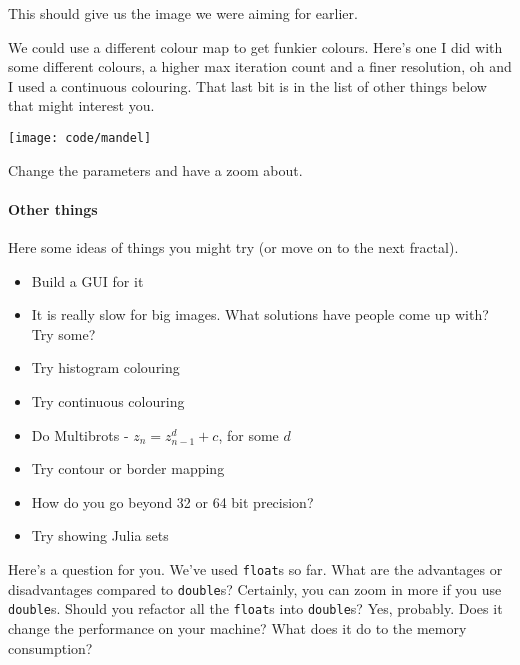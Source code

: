 \documentclass{article}
\begin{document}
            This should give us the image we were aiming for earlier.
            
            We could use a different colour map to get funkier colours. Here's one I did with some different colours, a higher max
            iteration count and a finer resolution, oh and I used a continuous colouring. That last bit is in the list of other things
            below that might interest you.
            
            \texttt{[image: code/mandel]}
            
            Change the parameters and have a zoom about.
        
        \newpage
        \paragraph{Other things}
            Here some ideas of things you might try (or move on to the next fractal).
            \begin{itemize}
                \item Build a GUI for it
                \item It is really slow for big images. What solutions have people come up with? Try some?
                \item Try histogram colouring
                \item Try continuous colouring
                \item Do Multibrots - $z_n = z_{n-1}^d + c$, for some $d$
                \item Try contour or border mapping
                \item How do you go beyond 32 or 64 bit precision?
                \item Try showing Julia sets
            \end{itemize}
            
            Here's a question for you. We've used \texttt{float}s so far. What are the advantages or disadvantages compared to
            \texttt{double}s? Certainly, you can zoom in more if you use \texttt{double}s. Should you refactor all the \texttt{float}s into
            \texttt{double}s? Yes, probably. Does it change the performance on your machine? What does it do to the memory consumption?
            
                
\end{document}
